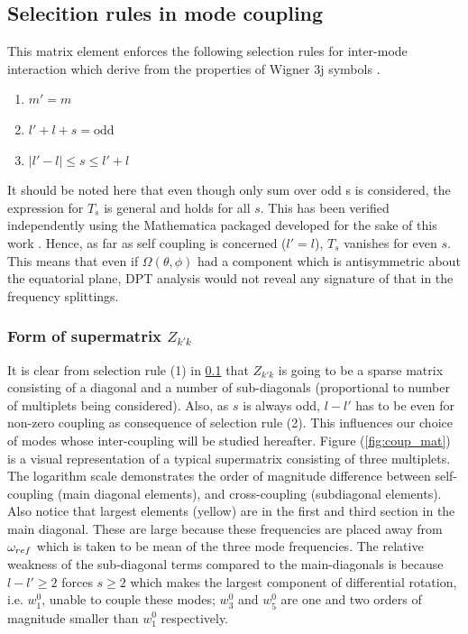 \subsection{Selecition rules in mode coupling}\label{sec:selec_rules}
This matrix element enforces the following selection rules for inter-mode interaction which derive from the properties of Wigner 3j symbols \cite{lavely92}.
\begin{enumerate}
\item $m'=m$
\item $l'+l+s = \text{odd}$
\item $|l'-l| \leq s \leq l'+l$
\end{enumerate}
It should be noted here that even though only sum over odd s is considered, the expression for $T_s$ is general and holds for all $s$. This has been verified independently using the Mathematica packaged developed for the sake of this work \cite{GSH_repo}. Hence, as far as self coupling is concerned ($l'=l$), $T_s$ vanishes for even $s$. This means that even if $\Omega(\theta,\phi)$ had a component which is antisymmetric about the equatorial plane, DPT analysis would not reveal any signature of that in the frequency splittings.

\subsubsection{Form of supermatrix $Z_{k'k}$}

It is clear from selection rule (1) in \ref{sec:selec_rules} that $Z_{k'k}$ is going to be a sparse matrix consisting of a diagonal and a number of sub-diagonals (proportional to number of multiplets being considered). Also, as $s$ is always odd, $l-l'$ has to be even for non-zero coupling as consequence of selection rule (2). This influences our choice of modes whose inter-coupling will be studied hereafter. Figure (\ref{fig:coup_mat}) is a visual representation of a typical supermatrix consisting of three multiplets. The logarithm scale demonstrates the order of magnitude difference between self-coupling (main diagonal elements), and cross-coupling (subdiagonal elements). Also notice that largest elements (yellow) are in the first and third section in the main diagonal. These are large because these frequencies are placed away from $\omega_{ref}$ which is taken to be mean of the three mode frequencies. The relative weakness of the sub-diagonal terms compared to the main-diagonals is because $l-l'\geq 2$ forces $s\geq 2$ which makes the largest component of differential rotation, i.e. $w_1^0$, unable to couple these modes; $w_3^0$ and $w_5^0$ are one and two orders of magnitude smaller than $w_1^0$ respectively.

